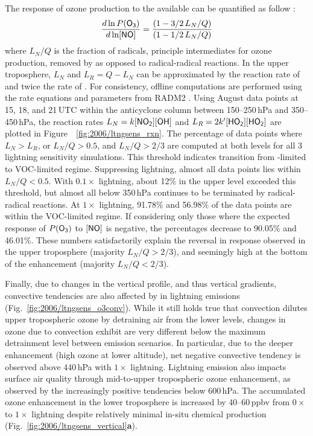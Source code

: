 The response of ozone production to the available  can be quantified as follow \citep{Kleinman:2001fk}:
\begin{equation}\label{eqn:k01NO}
	\frac{d\ln P(\chem{O_3})}{d\ln[\chem{NO}]} = \frac{(1-3/2\,L_N/Q)}{(1-1/2\,L_N/Q)}
\end{equation}
where $L_N/Q$ is the fraction of  radicals, principle intermediates for ozone production, removed by
 as opposed to radical-radical reactions. In the upper troposphere, $L_N$ and $L_R=Q-L_N$ can be
approximated by the reaction rate of  and twice the rate of . For consistency,
offline computations are performed using the rate equations and parameters from RADM2
\citep[][and references therein]{Stockwell:1990ez}. Using August data points at 15, 18, and 21\,\unit{UTC} within
the anticyclone column between 150--250\,\unit{hPa} and 350--450\,\unit{hPa}, the reaction rates
$L_N=k\chem{[NO_2][OH]}$ and $L_R=2k'\chem{[HO_2][HO_2]}$ are plotted in Figure~~\ref{fig:2006/ltngsens_rxn}.
The percentage of data points where $L_N>L_R$, or $L_N/Q > 0.5$, and $L_N/Q>2/3$ are computed at both
levels for all 3 lightning sensitivity simulations. This threshold indicates transition from -limited to
VOC-limited regime. Suppressing lightning, almost all data points lies within $L_N/Q<0.5$. With $0.1\times$
lightning, about 12\% in the upper level exceeded this threshold, but almost all  below 350\,\unit{hPa}
continues to be terminated by radical-radical reactions. At $1\times$ lightning, 91.78\% and 56.98\% of the data
points are within the VOC-limited regime. If considering only those where the expected response of $P(\chem{O_3})$
to $[\chem{NO}]$ is negative, the percentages decrease to 90.05\% and 46.01\%. These numbers satisfactorily
explain the reversal in response observed in the upper troposphere (majority $L_N/Q>2/3$), and seemingly high
at the bottom of the enhancement (majority $L_N/Q<2/3$).

Finally, due to changes in the vertical profile, and thus vertical gradients, convective tendencies are also affected by
in lightning emissions (Fig.~\ref{fig:2006/ltngsens_o3conv}). While it still holds true that convection dilutes upper
tropospheric ozone by detraining air from the lower levels, changes in ozone due to convection exhibit are very different
below the maximum detrainment level between emission scenarios. In particular, due to the deeper enhancement (high
ozone at lower altitude), net negative convective tendency is observed above 440\,\unit{hPa} with $1\times$ lightning.
Lightning emission also impacts surface air quality through mid-to-upper tropospheric ozone enhancement, as observed
by the increasingly positive tendencies below 600\,\unit{hPa}. The accumulated ozone enhancement in the lower
troposphere is increased by 40--60\,\unit{ppbv} from $0\times$ to $1\times$ lightning despite relatively minimal in-situ
chemical production (Fig.~\ref{fig:2006/ltngsens_vertical}{\bf a}).

